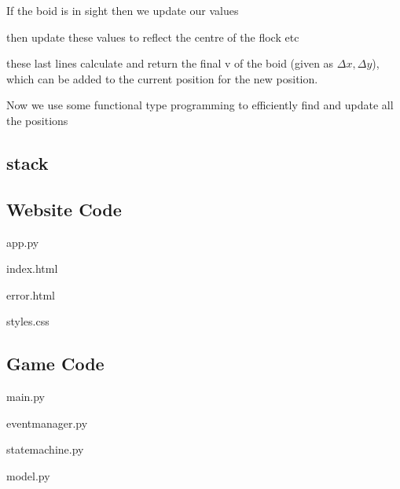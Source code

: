 If the boid is in sight then we update our values


then update these values to reflect the centre of the flock etc


these last lines calculate and return the final v of the boid (given as $\Delta x, \Delta y$), which can be added to the current position for the new position.


Now we use some functional type programming to efficiently find and update all the positions


\subsection{stack}





\lstlistoflistings

\subsection{Website Code}

app.py


index.html


error.html


styles.css



\subsection{Game Code}

main.py


eventmanager.py


statemachine.py


model.py


